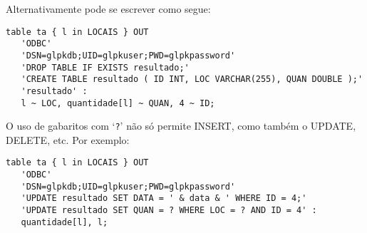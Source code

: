 \documentclass[11pt, brazil]{report}
\begin{document}

\noindent
Alternativamente pode se escrever como segue:

\begin{verbatim}
table ta { l in LOCAIS } OUT
   'ODBC'
   'DSN=glpkdb;UID=glpkuser;PWD=glpkpassword'
   'DROP TABLE IF EXISTS resultado;'
   'CREATE TABLE resultado ( ID INT, LOC VARCHAR(255), QUAN DOUBLE );'
   'resultado' :
   l ~ LOC, quantidade[l] ~ QUAN, 4 ~ ID;
\end{verbatim}

O uso de gabaritos com `\verb|?|' não só permite INSERT, como também o
UPDATE, DELETE, etc. Por exemplo:

\begin{verbatim}
table ta { l in LOCAIS } OUT
   'ODBC'
   'DSN=glpkdb;UID=glpkuser;PWD=glpkpassword'
   'UPDATE resultado SET DATA = ' & data & ' WHERE ID = 4;'
   'UPDATE resultado SET QUAN = ? WHERE LOC = ? AND ID = 4' :
   quantidade[l], l;
\end{verbatim}
\end{document}
